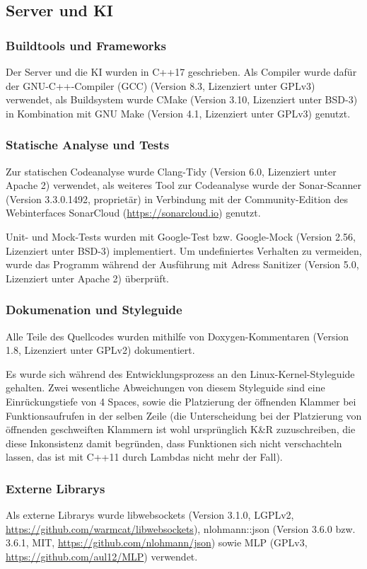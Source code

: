 \subsection{Server und KI}
\subsubsection{Buildtools und Frameworks}
Der Server und die KI wurden in C++17 geschrieben.
Als Compiler wurde dafür der GNU-C++-Compiler (GCC) (Version 8.3, Lizenziert unter GPLv3) verwendet,
als Buildsystem wurde CMake (Version 3.10, Lizenziert unter BSD-3) in Kombination mit GNU Make (Version 4.1, Lizenziert unter GPLv3) genutzt.

\subsubsection{Statische Analyse und Tests}
Zur statischen Codeanalyse wurde Clang-Tidy (Version 6.0, Lizenziert unter Apache 2) verwendet,
als weiteres Tool zur Codeanalyse wurde der Sonar-Scanner (Version 3.3.0.1492, proprietär) in Verbindung mit der Community-Edition des Webinterfaces SonarCloud (\url{https://sonarcloud.io}) genutzt.

Unit- und Mock-Tests wurden mit Google-Test bzw. Google-Mock (Version 2.56, Lizenziert unter BSD-3) implementiert.
Um undefiniertes Verhalten zu vermeiden, wurde das Programm während der Ausführung mit Adress Sanitizer (Version 5.0, Lizenziert unter Apache 2) überprüft.

\subsubsection{Dokumenation und Styleguide}
Alle Teile des Quellcodes wurden mithilfe von Doxygen-Kommentaren (Version 1.8, Lizenziert unter GPLv2) dokumentiert.

Es wurde sich während des Entwicklungsprozess an den Linux-Kernel-Styleguide gehalten. 
Zwei wesentliche Abweichungen von diesem Styleguide sind eine Einrückungstiefe von 4 Spaces, sowie die Platzierung der öffnenden Klammer bei Funktionsaufrufen in der selben Zeile 
(die Unterscheidung bei der Platzierung von öffnenden geschweiften Klammern ist wohl ursprünglich K\&R zuzuschreiben, die diese Inkonsistenz damit begründen, 
dass Funktionen sich nicht verschachteln lassen, das ist mit C++11 durch Lambdas nicht mehr der Fall).

\subsubsection{Externe Librarys}
Als externe Librarys wurde libwebsockets (Version 3.1.0, LGPLv2, \url{https://github.com/warmcat/libwebsockets}), 
nlohmann::json (Version 3.6.0 bzw. 3.6.1, MIT, \url{https://github.com/nlohmann/json}) sowie MLP (GPLv3, \url{https://github.com/aul12/MLP}) verwendet.


